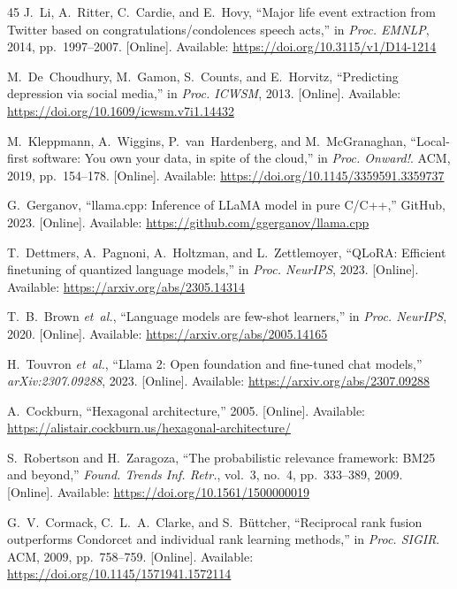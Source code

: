 \documentclass[conference]{IEEEtran}
\begin{document}
\begin{thebibliography}{45}
J.~Li, A.~Ritter, C.~Cardie, and E.~Hovy, ``Major life event extraction from Twitter based on congratulations/condolences speech acts,'' in \emph{Proc. EMNLP}, 2014, pp.~1997--2007. [Online]. Available: \url{https://doi.org/10.3115/v1/D14-1214}

M.~De~Choudhury, M.~Gamon, S.~Counts, and E.~Horvitz, ``Predicting depression via social media,'' in \emph{Proc. ICWSM}, 2013. [Online]. Available: \url{https://doi.org/10.1609/icwsm.v7i1.14432}

M.~Kleppmann, A.~Wiggins, P.~van~Hardenberg, and M.~McGranaghan, ``Local-first software: You own your data, in spite of the cloud,'' in \emph{Proc. Onward!}. ACM, 2019, pp.~154--178. [Online]. Available: \url{https://doi.org/10.1145/3359591.3359737}

G.~Gerganov, ``llama.cpp: Inference of LLaMA model in pure C/C++,'' GitHub, 2023. [Online]. Available: \url{https://github.com/ggerganov/llama.cpp}

T.~Dettmers, A.~Pagnoni, A.~Holtzman, and L.~Zettlemoyer, ``QLoRA: Efficient finetuning of quantized language models,'' in \emph{Proc. NeurIPS}, 2023. [Online]. Available: \url{https://arxiv.org/abs/2305.14314}

T.~B.~Brown \emph{et~al.}, ``Language models are few-shot learners,'' in \emph{Proc. NeurIPS}, 2020. [Online]. Available: \url{https://arxiv.org/abs/2005.14165}

H.~Touvron \emph{et~al.}, ``Llama 2: Open foundation and fine-tuned chat models,'' \emph{arXiv:2307.09288}, 2023. [Online]. Available: \url{https://arxiv.org/abs/2307.09288}

A.~Cockburn, ``Hexagonal architecture,'' 2005. [Online]. Available: \url{https://alistair.cockburn.us/hexagonal-architecture/}

S.~Robertson and H.~Zaragoza, ``The probabilistic relevance framework: BM25 and beyond,'' \emph{Found. Trends Inf. Retr.}, vol.~3, no.~4, pp.~333--389, 2009. [Online]. Available: \url{https://doi.org/10.1561/1500000019}

G.~V.~Cormack, C.~L.~A.~Clarke, and S.~B\"uttcher, ``Reciprocal rank fusion outperforms Condorcet and individual rank learning methods,'' in \emph{Proc. SIGIR}. ACM, 2009, pp.~758--759. [Online]. Available: \url{https://doi.org/10.1145/1571941.1572114}


\end{thebibliography}
\end{document}

